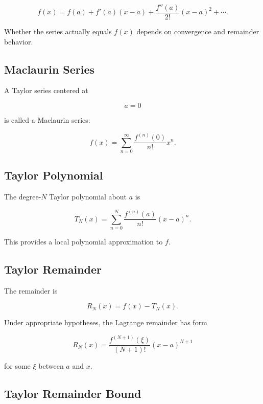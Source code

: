 \[
\boxed{
f(x)
=
f(a)
+
f'(a)(x-a)
+
\frac{f''(a)}{2!}(x-a)^2
+
\cdots.
}
\]

Whether the series actually equals \(f(x)\) depends on convergence and
remainder behavior.

\subsection{Maclaurin Series}
\label{subsec:maclaurin-series-reference}

A Taylor series centered at

\[
a=0
\]

is called a Maclaurin series:

\[
\boxed{
f(x)
=
\sum_{n=0}^{\infty}
\frac{
f^{(n)}(0)
}{
n!
}
x^n.
}
\]

\subsection{Taylor Polynomial}
\label{subsec:taylor-polynomial-reference}

The degree-\(N\) Taylor polynomial about \(a\) is

\[
\boxed{
T_N(x)
=
\sum_{n=0}^{N}
\frac{
f^{(n)}(a)
}{
n!
}
(x-a)^n.
}
\]

This provides a local polynomial approximation to \(f\).

\subsection{Taylor Remainder}
\label{subsec:taylor-remainder-reference}

The remainder is

\[
\boxed{
R_N(x)
=
f(x)-T_N(x).
}
\]

Under appropriate hypotheses, the Lagrange remainder has form

\[
\boxed{
R_N(x)
=
\frac{
f^{(N+1)}(\xi)
}{
(N+1)!
}
(x-a)^{N+1}
}
\]

for some \(\xi\) between \(a\) and \(x\).

\subsection{Taylor Remainder Bound}
\label{subsec:taylor-remainder-bound}

